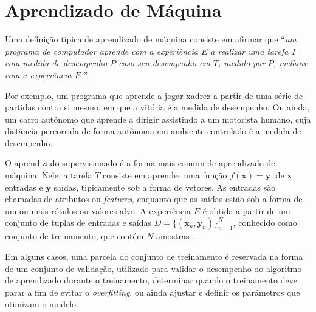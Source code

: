 \section{Aprendizado de Máquina}
Uma definição típica de aprendizado de máquina consiste em afirmar que ``\textit{um
programa de computador aprende com a experiência $E$ a realizar uma tarefa $T$
com medida de desempenho $P$ caso seu desempenho em $T$, medido por $P$, melhore
com a experiência $E$} ''\cite{mitchell1997}.

Por exemplo, um programa que aprende a jogar xadrez a partir de uma série de
partidas contra si mesmo, em que a vitória é a medida de desempenho. Ou ainda,
um carro autônomo que aprende a dirigir assistindo a um motorista humano, cuja
distância percorrida de forma autônoma em ambiente controlado é a medida de
desempenho.

O aprendizado supervisionado é a forma mais comum de aprendizado de máquina.
Nele, a tarefa $T$ consiste em aprender uma função $f(\mathbf{x}) = \mathbf{y}$,
de $\mathbf{x}$ entradas e $\mathbf{y}$ saídas, tipicamente sob a forma de
vetores. As entradas são chamadas de atributos ou \textit{features}, enquanto
que as saídas estão sob a forma de um ou mais rótulos ou valores-alvo. A
experiência $E$ é obtida a partir de um conjunto de tuplas de entradas e saídas
$D = \{(\mathbf{x}_n, \mathbf{y}_n)\}_{n=1}^N$, conhecido como conjunto de
treinamento, que contém $N$ amostras \cite{pml1Book}.

Em alguns casos, uma parcela do conjunto de treinamento é reservada na forma de
um conjunto de validação, utilizado para validar o desempenho do algoritmo de
aprendizado durante o treinamento, determinar quando o treinamento deve parar a
fim de evitar o \textit{overfitting}, ou ainda ajustar e definir os parâmetros
que otimizam o modelo.

